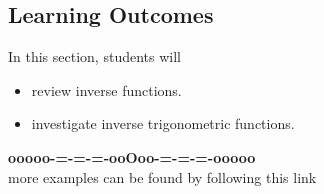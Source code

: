 \documentclass{ximera}
\begin{document}
\subsection*{Learning Outcomes}

\begin{sectionOutcomes}
In this section, students will 

\begin{itemize}
\item review inverse functions.
\item investigate inverse trigonometric functions.
\end{itemize}
\end{sectionOutcomes}








\begin{center}
\textbf{\textcolor{green!50!black}{ooooo-=-=-=-ooOoo-=-=-=-ooooo}} \\

more examples can be found by following this link\\ 

\end{center}
\end{document}
